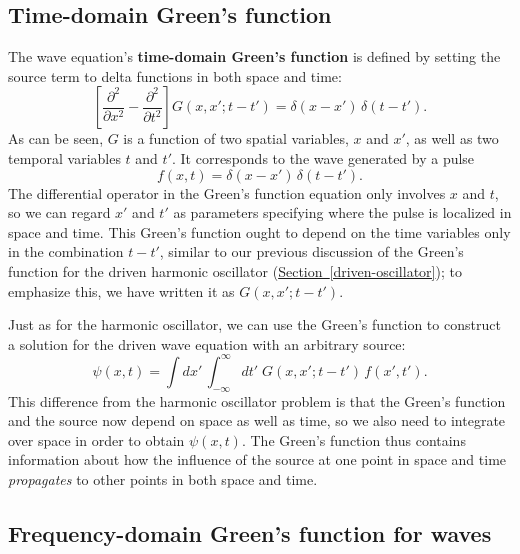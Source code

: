 \documentclass[10pt,a4paper]{article}
\begin{document}
\subsection{Time-domain Green's function}
\label{time-domain-greens-function}

The wave equation's \textbf{time-domain Green's function} is defined
by setting the source term to delta functions in both space and time:
\begin{equation}
  \left[\frac{\partial^2}{\partial x^2}
    - \frac{\partial^2}{\partial t^2} \right] G(x,x';t-t')
  = \delta(x-x')\, \delta(t-t').
\end{equation}
As can be seen, $G$ is a function of two spatial variables, $x$ and
$x'$, as well as two temporal variables $t$ and $t'$. It corresponds
to the wave generated by a pulse
\begin{equation}
f(x,t) = \delta(x-x')\,\delta(t-t').
\end{equation}
The differential operator in the Green's function equation only
involves $x$ and $t$, so we can regard $x'$ and $t'$ as parameters
specifying where the pulse is localized in space and time. This
Green's function ought to depend on the time variables only in the
combination $t-t'$, similar to our previous discussion of the Green's
function for the driven harmonic oscillator
(\hyperref[driven-oscillator]{Section~\ref{driven-oscillator}}); to
emphasize this, we have written it as $G(x,x';t-t')$.

Just as for the harmonic oscillator, we can use the Green's function to
construct a solution for the driven wave equation with an arbitrary
source:
\begin{equation}
\psi(x,t) = \int dx' \,\int_{-\infty}^\infty dt'\; G(x,x';t-t') \, f(x', t').
\end{equation}
This difference from the harmonic oscillator problem is that the
Green's function and the source now depend on space as well as time,
so we also need to integrate over space in order to obtain
$\psi(x,t)$. The Green's function thus contains information about how
the influence of the source at one point in space and time
\emph{propagates} to other points in both space and time.

\subsection{Frequency-domain Green's function for waves}
\label{frequency-domain}
\end{document}
